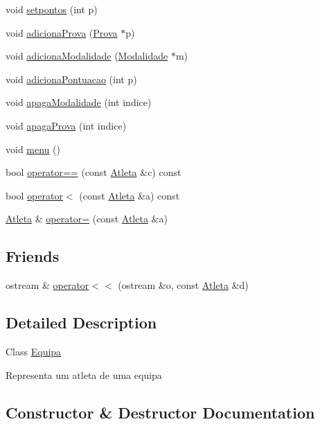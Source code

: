 \begin{DoxyCompactItemize}
void \hyperlink{class_atleta_a9af09149a6b3c22ca514154b4a29b7f3}{setpontos} (int p)
\item 
void \hyperlink{class_atleta_a7a4bee73158d8ee13b4812eb96decb61}{adiciona\+Prova} (\hyperlink{class_prova}{Prova} $\ast$p)
\item 
void \hyperlink{class_atleta_a036b7b9cdf087a63e601b4e3a9f5552f}{adiciona\+Modalidade} (\hyperlink{class_modalidade}{Modalidade} $\ast$m)
\item 
void \hyperlink{class_atleta_af143bde354ddd015eeaaf7ea819887fd}{adiciona\+Pontuacao} (int p)
\item 
void \hyperlink{class_atleta_a72dcf8a7a26d47eb5f39e876cb9537bd}{apaga\+Modalidade} (int indice)
\item 
void \hyperlink{class_atleta_aeefa19a643057d8688448aeafadc3dcb}{apaga\+Prova} (int indice)
\item 
void \hyperlink{class_atleta_a24b4c70d5e08a875612c8e234fa4ab44}{menu} ()
\item 
bool \hyperlink{class_atleta_a2c2de5e4a0f9963dd9c1a6507b593aed}{operator==} (const \hyperlink{class_atleta}{Atleta} \&c) const 
\item 
bool \hyperlink{class_atleta_a86b4c8fda3582aab61d9796bc5bdced3}{operator$<$} (const \hyperlink{class_atleta}{Atleta} \&a) const 
\item 
\hyperlink{class_atleta}{Atleta} \& \hyperlink{class_atleta_aea00de3983e444705d4f06702b344413}{operator=} (const \hyperlink{class_atleta}{Atleta} \&a)
\end{DoxyCompactItemize}
\subsection*{Friends}
\begin{DoxyCompactItemize}
\item 
ostream \& \hyperlink{class_atleta_a49ef3d4a229ab0e44df89ff6bf7f0e61}{operator$<$$<$} (ostream \&o, const \hyperlink{class_atleta}{Atleta} \&d)
\end{DoxyCompactItemize}


\subsection{Detailed Description}
Class \hyperlink{class_equipa}{Equipa}

Representa um atleta de uma equipa 

\subsection{Constructor \& Destructor Documentation}
\hypertarget{class_atleta_a055b02bad1b7615536e583e1f3708ec3}{}
